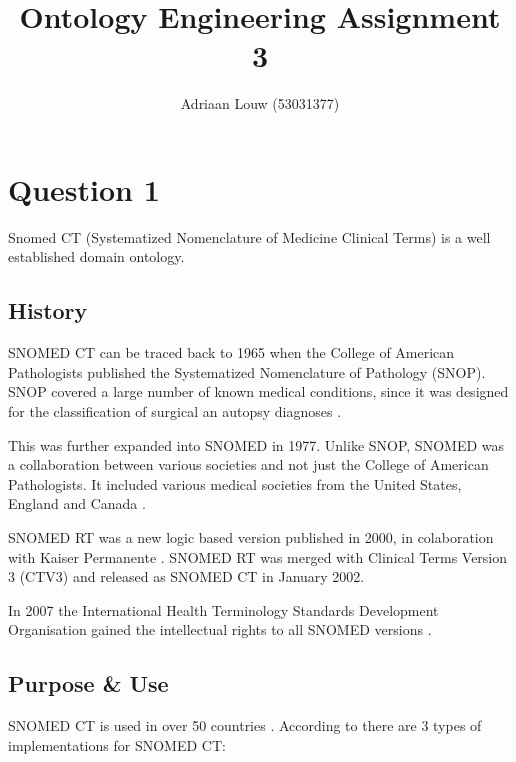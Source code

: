 \documentclass[12pt,a4paper]{article}
\title{Ontology Engineering Assignment 3}
\author{Adriaan Louw (53031377)}
\begin{document}
\maketitle

\section{Question 1}

Snomed CT (Systematized Nomenclature of Medicine Clinical Terms) is a well established domain ontology. 

\subsection{History}

SNOMED CT can be traced back to 1965 when the College of American Pathologists published the Systematized Nomenclature of Pathology (SNOP). SNOP covered a large number of known medical conditions, since it was designed for the classification of surgical an autopsy diagnoses \citep{Cote1980}.

This was further expanded into SNOMED in 1977. Unlike SNOP, SNOMED was a collaboration between various societies and not just the College of American Pathologists. It included various medical societies from the United States, England and Canada \citep{Cote1980}. 

SNOMED RT was a new logic based version published in 2000, in colaboration with Kaiser Permanente \citep{sn2018,nih}. SNOMED RT was merged with Clinical Terms Version 3 (CTV3) and released as SNOMED CT in January 2002. \citep{sn2018}

In 2007 the International Health Terminology Standards Development Organisation gained the intellectual rights to all SNOMED versions \citep{nih}.

\subsection{Purpose \& Use}

SNOMED CT is used in over 50 countries \cite{Lee2013}. According to \cite{snomedcttech2015} there are 3 types of implementations for SNOMED CT:
\end{document}
